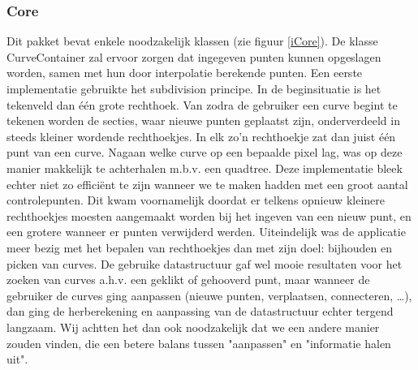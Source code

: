 \documentclass[a4paper,11pt,oneside, titlepage]{article}
\begin{document}
\subsubsection{Core}
\label{tcore}
Dit pakket bevat enkele noodzakelijk klassen (zie figuur \ref{iCore}).\newline \newline
De klasse CurveContainer zal ervoor zorgen dat ingegeven punten kunnen opgeslagen worden, samen
met hun door interpolatie berekende punten. \newline \newline
Een eerste implementatie gebruikte het subdivision principe. In de beginsituatie is het tekenveld
dan \'e\'en grote rechthoek. Van zodra de gebruiker een curve begint te tekenen worden de secties,
waar nieuwe punten geplaatst zijn, onderverdeeld in steeds kleiner wordende rechthoekjes. In elk zo'n
rechthoekje zat dan juist \'e\'en punt van een curve. Nagaan welke curve op een bepaalde pixel lag, was op deze manier
makkelijk te achterhalen m.b.v. een quadtree.\newline
Deze implementatie bleek echter niet zo effici\"ent te zijn wanneer we te maken hadden met een groot
aantal controlepunten. Dit kwam voornamelijk doordat er telkens opnieuw kleinere rechthoekjes
moesten aangemaakt worden bij het ingeven van een nieuw punt, en een grotere wanneer er punten verwijderd
werden. Uiteindelijk was de applicatie meer bezig met het bepalen van rechthoekjes dan met zijn
doel: bijhouden en picken van curves. De gebruike datastructuur gaf wel mooie resultaten voor het zoeken van curves a.h.v.
een geklikt of gehooverd punt, maar wanneer de gebruiker de curves ging aanpassen (nieuwe punten, verplaatsen, connecteren, \ldots), dan ging de 
herberekening en aanpassing van de datastructuur echter tergend langzaam. Wij achtten het dan ook noodzakelijk dat we een andere manier
zouden vinden, die een betere balans tussen "aanpassen" en "informatie halen uit". \newline \newline
\end{document}
